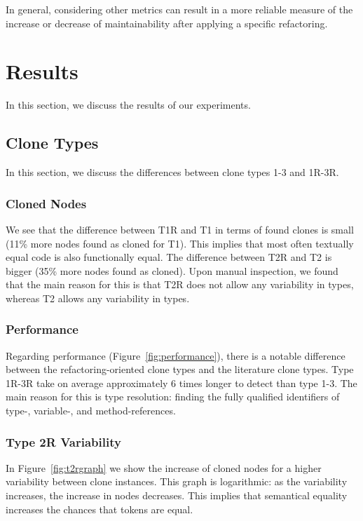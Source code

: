 In general, considering other metrics can result in a more reliable measure of the increase or decrease of maintainability after applying a specific refactoring.

\section{Results}
In this section, we discuss the results of our experiments.

\subsection{Clone Types}
In this section, we discuss the differences between clone types 1-3 and 1R-3R.

\subsubsection{Cloned Nodes}
We see that the difference between T1R and T1 in terms of found clones is small (11\% more nodes found as cloned for T1). This implies that most often textually equal code is also functionally equal. The difference between T2R and T2 is bigger (35\% more nodes found as cloned). Upon manual inspection, we found that the main reason for this is that T2R does not allow any variability in types, whereas T2 allows any variability in types.

\subsubsection{Performance}
Regarding performance (Figure~\ref{fig:performance}), there is a notable difference between the refactoring-oriented clone types and the literature clone types. Type 1R-3R take on average approximately 6 times longer to detect than type 1-3. The main reason for this is type resolution: finding the fully qualified identifiers of type-, variable-, and method-references.

\subsubsection{Type 2R Variability}
In Figure~\ref{fig:t2rgraph} we show the increase of cloned nodes for a higher variability between clone instances. This graph is logarithmic: as the variability increases, the increase in nodes decreases. This implies that semantical equality increases the chances that tokens are equal.

